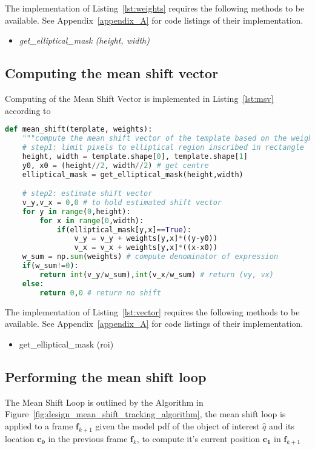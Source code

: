 The implementation of Listing~\ref{lst:weights} requires the following methods to
be available. See Appendix~\ref{appendix_A} for code listings of their implementation. 
\begin{itemize}
    \item \textit{get\_elliptical\_mask (height, width)}
\end{itemize}

\subsection{Computing the mean shift vector}
Computing of the Mean Shift Vector is implemented in Listing~\ref{lst:msv}
according to %

\begin{lstlisting}[language=Python, caption={Function computing the mean shift vector}, captionpos=b, label={lst:msv}]
def mean_shift(template, weights):
    """compute the mean shift vector of the template based on the weights"""
    # step1: limit pixels to elliptical region inscribed in rectangle
    height, width = template.shape[0], template.shape[1]
    y0, x0 = (height//2, width//2) # get centre 
    elliptical_mask = get_elliptical_mask(height,width)

    # step2: estimate shift vector
    v_y,v_x = 0,0 # to hold estimated shift vector
    for y in range(0,height):
        for x in range(0,width): 
            if(elliptical_mask[y,x]==True):
                v_y = v_y + weights[y,x]*((y-y0)) 
                v_x = v_x + weights[y,x]*((x-x0))
    w_sum = np.sum(weights) # compute denominator of expression
    if(w_sum!=0):
        return int(v_y/w_sum),int(v_x/w_sum) # return (vy, vx)
    else:
        return 0,0 # return no shift
\end{lstlisting}

The implementation of Listing~\ref{lst:vector} requires the following methods to
be available. See Appendix~\ref{appendix_A} for code listings of their implementation. 
\begin{itemize}
    \item get\_elliptical\_mask (roi)
\end{itemize}

\subsection{Performing the mean shift loop}
The Mean Shift Loop is outlined by the Algorithm in
Figure~\ref{fig:design_mean_shift_tracking_algorithm}, the mean shift loop is
applied to a frame $\mathbf{f}_{k+1}$ given the model pdf of the object of
interest $\hat{q}$ and its location $\mathbf{c_0}$ in the previous frame
$\mathbf{f}_{k}$, to compute it's current position $\mathbf{c_1}$ in
$\mathbf{f}_{k+1}$

